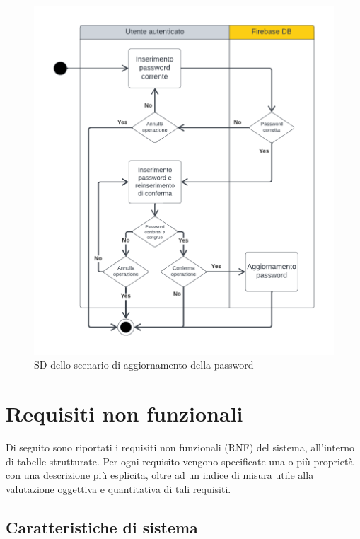 \documentclass[11pt, a4paper]{article}
\theoremstyle{definition} %
\begin{document}
\begin{figure}[H]
\centering
\includegraphics[scale=0.65]{materiale/ucdiagrams/swimlanepassword.pdf}
\caption{SD dello scenario di aggiornamento della password}
\label{slpassword}
\end{figure}


\newpage
\section{Requisiti non funzionali}
Di seguito sono riportati i requisiti non funzionali (RNF)
del sistema, all'interno di tabelle strutturate. Per ogni requisito vengono
specificate una o più proprietà con una descrizione più esplicita,
oltre ad un indice di misura utile alla valutazione oggettiva
e quantitativa di tali requisiti.

\subsection{Caratteristiche di sistema}
\end{document}
